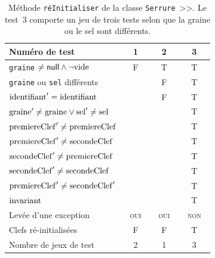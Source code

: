 \documentclass[11pt,article]{article}
\newcommand{\nullvalue}{\textsf{null}\xspace}
\newcommand{\emptyvalue}{\ensuremath\mathrm{vide}}
\newcommand{\invariant}{\ensuremath\mathrm{invariant}}
\begin{document}
\begin{table}[!ht]
\begin{center}
\begin{tabular}{|p{0.4\linewidth}|c|c|c|}
\hline
Numéro de test
&1&2&3\\
\hline
\hline
\texttt{graine} $\neq \nullvalue \land \neg \emptyvalue$
&F&T&T\\
\hline
\texttt{graine} ou \texttt{sel} différents
& &F&T\\
\hline
\hline
$\mathrm{identifiant}' = \mathrm{identifiant}$
& &F&T\\
\hline
$\mathrm{graine}' \neq \mathrm{graine} \lor \mathrm{sel}' \neq \mathrm{sel}$
& & &T\\
\hline
$\mathrm{premiereClef}' \neq \mathrm{premiereClef}$
& & &T\\
\hline
$\mathrm{premiereClef}' \neq \mathrm{secondeClef}$
& & &T\\
\hline
$\mathrm{secondeClef}' \neq \mathrm{premiereClef}$
& & &T\\
\hline
$\mathrm{secondeClef}' \neq \mathrm{secondeClef}$
& & &T\\
\hline
$\mathrm{premiereClef}' \neq \mathrm{secondeClef}'$
& & &T\\
\hline
$\invariant$
& & &T\\
\hline
Levée d'une exception&\textsc{oui}&\textsc{oui}&\textsc{non}\\
\hline
\hline
Clefs ré-initialisées
&F&F&T\\
\hline
\hline
Nombre de jeux de test 
&2&1&3\\
\hline
\end{tabular}
\caption{Méthode \texttt{réInitialiser} de la classe
  \texttt{Serrure}~>>. Le test~3 comporte un jeu de trois tests selon
  que la graine ou le sel sont différents.}
\end{center}
\end{table}
\end{document}
